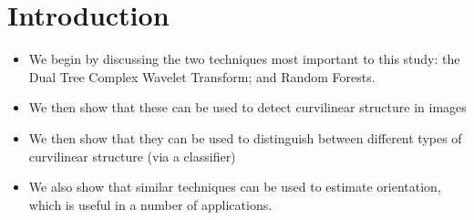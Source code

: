 \documentclass{report}
\title{\ttl}
\author{Authors}
\begin{document}
\maketitle

\begin{abstract}
Estimating orientation of image structure underpins applications including digital mammography, retinography and fingerprint analysis. We consider different choices of filter bank including those based on first and second derivatives, efficient Haar-like features and the Dual Tree Complex Wavelet Transform. We then investigate how standard regressors (linear regression, Boosting and Random Forests) may be adapted to use the responses to these filter banks in order to predict orientation of image structure. For a quantitative evaluation, we use synthetic images based on mammograms and the publicly available DRIVE database of retinal images, and show that Random Forests and the wavelet transform offer superior accuracy though at a cost in efficiency. Qualitative results are also presented for real mammograms and fingerprint images.
\end{abstract}

\section{Introduction}
\begin{itemize}
\item We begin by discussing the two techniques most important to this study: the Dual Tree Complex Wavelet Transform; and Random Forests.

\item We then show that these can be used to detect curvilinear structure in images

\item We then show that they can be used to distinguish between different types of curvilinear structure (via a classifier)

\item We also show that similar techniques can be used to estimate orientation, which is useful in a number of applications.
\end{itemize}
\end{document}
